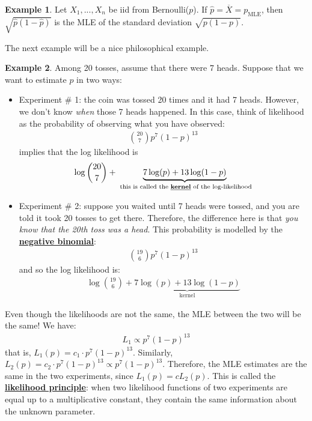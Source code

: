 \documentclass[11pt]{scrartcl}
\theoremstyle{definition}
\newtheorem{ex}{Example}
\theoremstyle{remark}
\newcommand{\dfn}[1]{\textbf{\underline{#1}}}
\begin{document}
{\begin{ex}
	Let $X_1, ..., X_n$ be iid from Bernoulli($p$). If $\hat{p} = \overline{X} = p_{\text{MLE}}$, then $\sqrt{\hat{p}(1-\hat{p})}$ is the MLE of the standard deviation $\sqrt{p(1-p)}$. 
\end{ex}

The next example will be a nice philosophical example. 

\begin{ex} 
	Among 20 tosses, assume that there were 7 heads. Suppose that we want to estimate $p$ in two ways: 
	\begin{itemize}[noitemsep]
		\item Experiment \# 1: the coin was tossed 20 times and it had 7 heads. However, we don't know \emph{when} those 7 heads happened. In this case, think of likelihood as the probability of observing what you have observed: 
		\begin{align*}
			\binom{20}{7} p^7 (1-p)^{13} 	
		\end{align*}
		implies that the log likelihood is 
		\begin{align*}
			\log \binom{20}{7} + \underbrace{7 \log(p) + 13 \log(1-p)}_{\text{ this is called the \dfn{kernel} of the log-likelihood}}
		\end{align*}
		\item Experiment \# 2: suppose you waited until 7 heads were tossed, and you are told it took 20 tosses to get there. Therefore, the difference here is that \emph{you know that the 20th toss was a head}. This probability is modelled by the \dfn{negative binomial}: 
		 \begin{align*}
 			\binom{19}{6} p^7 (1-p)^{13} 
 		\end{align*}
		and so the log likelihood is: 
		\begin{align*}
			\log \binom{19}{6} + \underbrace{7 \log (p) + 13 \log (1-p)}_{\text{kernel}}	
		\end{align*}
	\end{itemize}	
	Even though the likelihoods are not the same, the MLE between the two will be the same! We have: 
	\begin{align}
		L_1 \propto p^7(1-p)^{13} 
	\end{align}
	that is, $L_1(p) = c_1 \cdot p^{7}(1-p)^{13}$. Similarly, $L_2(p)  =c_2 \cdot p^{7}(1-p)^{13} \propto p^7 (1-p)^{13}$. Therefore, the MLE estimates are the same in the two experiments, since $L_1(p) = c L_2(p)$. This is called the \dfn{likelihood principle}: when two likelihood functions of two experiments are equal up to a multiplicative constant, they contain the same information about the unknown parameter.
\end{ex}


}
\end{document}
